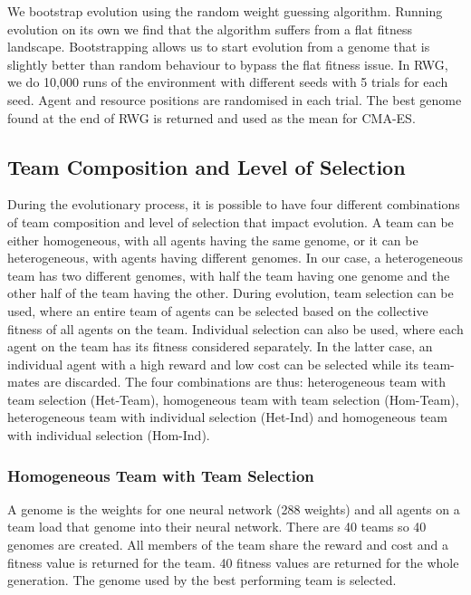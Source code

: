 \documentclass[12pt]{article}  %
\begin{document}
We bootstrap evolution using the random weight guessing algorithm. 
Running evolution on its own we find that the algorithm suffers from a flat fitness landscape.
Bootstrapping allows us to start evolution from a genome that is slightly better than random behaviour to bypass the flat fitness issue.
In RWG, we do 10,000 runs of the environment with different seeds with 5 trials for each seed. 
Agent and resource positions are randomised in each trial.
The best genome found at the end of RWG is returned and used as the mean for CMA-ES.

\subsection{Team Composition and Level of Selection}

During the evolutionary process, it is possible to have four different combinations of team composition and level of selection that impact evolution.
A team can be either homogeneous, with all agents having the same genome, or it can be heterogeneous, with agents having different genomes.
In our case, a heterogeneous team has two different genomes, with half the team having one genome and the other half of the team having the other.
During evolution, team selection can be used, where an entire team of agents can be selected based on the collective fitness of all agents on the team.
Individual selection can also be used, where each agent on the team has its fitness considered separately.
In the latter case, an individual agent with a high reward and low cost can be selected while its team-mates are discarded. 
The four combinations are thus: heterogeneous team with team selection (Het-Team), homogeneous team with team selection (Hom-Team), heterogeneous team with individual selection (Het-Ind) and homogeneous team with individual selection (Hom-Ind).\\



\subsubsection{Homogeneous Team with Team Selection}

A genome is the weights for one neural network (288 weights) and all agents on a team load that genome into their neural network.
There are 40 teams so 40 genomes are created. 
All members of the team share the reward and cost and a fitness value is returned for the team.
40 fitness values are returned for the whole generation. 
The genome used by the best performing team is selected.\\
\end{document}

